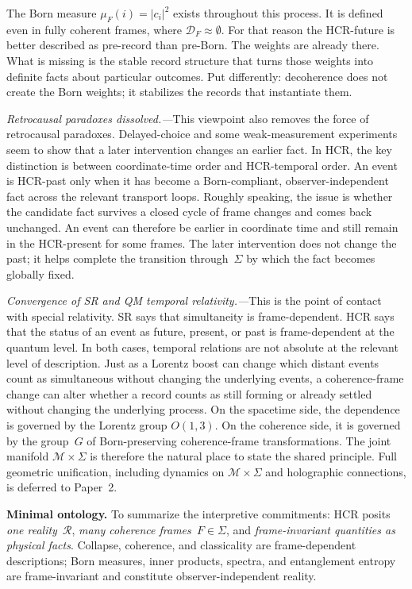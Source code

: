 \documentclass[aps,prd,twocolumn,superscriptaddress,nofootinbib,floatfix]{revtex4-2}
\newcommand{\Sig}{\Sigma}
\newcommand{\HCR}{HCR}
\newcommand{\CR}{\HCR}  %
\begin{document}
The Born measure $\mu_F(i) = |c_i|^2$ exists throughout this process. It is defined even in fully coherent frames, where $\mathcal{D}_F \approx \emptyset$. For that reason the HCR-future is better described as pre-record than pre-Born. The weights are already there. What is missing is the stable record structure that turns those weights into definite facts about particular outcomes. Put differently: decoherence does not create the Born weights; it stabilizes the records that instantiate them.

\textit{Retrocausal paradoxes dissolved.---}This viewpoint also removes the force of retrocausal paradoxes. Delayed-choice and some weak-measurement experiments seem to show that a later intervention changes an earlier fact. In \HCR{}, the key distinction is between coordinate-time order and HCR-temporal order. An event is HCR-past only when it has become a Born-compliant, observer-independent fact across the relevant transport loops. Roughly speaking, the issue is whether the candidate fact survives a closed cycle of frame changes and comes back unchanged. An event can therefore be earlier in coordinate time and still remain in the HCR-present for some frames. The later intervention does not change the past; it helps complete the transition through~$\Sig$ by which the fact becomes globally fixed.

\textit{Convergence of SR and QM temporal relativity.---}This is the point of contact with special relativity. SR says that simultaneity is frame-dependent. \CR{} says that the status of an event as future, present, or past is frame-dependent at the quantum level. In both cases, temporal relations are not absolute at the relevant level of description. Just as a Lorentz boost can change which distant events count as simultaneous without changing the underlying events, a coherence-frame change can alter whether a record counts as still forming or already settled without changing the underlying process. On the spacetime side, the dependence is governed by the Lorentz group $O(1,3)$. On the coherence side, it is governed by the group~$G$ of Born-preserving coherence-frame transformations. The joint manifold $\mathcal{M} \times \Sig$ is therefore the natural place to state the shared principle. Full geometric unification, including dynamics on $\mathcal{M} \times \Sig$ and holographic connections, is deferred to Paper~2.


\vspace{3em}
\noindent\textbf{Minimal ontology.} To summarize the interpretive commitments: \CR{} posits \emph{one reality~$\mathcal{R}$}, \emph{many coherence frames~$F \in \Sig$}, and \emph{frame-invariant quantities as physical facts}. Collapse, coherence, and classicality are frame-dependent descriptions; Born measures, inner products, spectra, and entanglement entropy are frame-invariant and constitute observer-independent reality.
\end{document}
